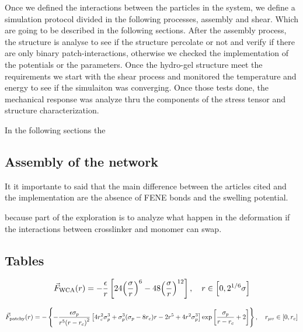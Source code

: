 \documentclass[../main.tex]{subfiles}
\begin{document}
Once we defined the interactions between the particles in the system, we define a simulation protocol divided in the following processes, assembly and shear.
Which are going to be described in the following sections.
After the assembly process, the structure is analyse to see if the structure percolate or not and verify if there are only binary patch-interactions, otherwise we checked the implementation of the potentials or the parameters.
Once the hydro-gel structure meet the requirements we start with the shear process and monitored the temperature and energy to see if the simulaiton was converging.
Once those tests done, the mechanical response was analyze thru the components of the stress tensor and structure characterization.

In the following sections the 

\subsection{Assembly of the network}\label{sec:descriptionSimulation}

It it importante to said that the main difference between the articles cited and the implementation are the absence of FENE bonds and the swelling potential.

because part of the exploration is to analyze what happen in the deformation if the interactions between crosslinker and monomer can swap.

\subsection{Tables}



\begin{gather}
\vec{F}_{\mathrm{WCA}}(r) = -\frac{\epsilon}{r}\left[24\qty(\frac{\sigma}{r})^6-48\qty(\frac{\sigma}{r})^{12}\right],\quad r\in\qty[0,2^{1/6}\sigma] 
\end{gather}


\begin{gather}
    \vec{F}_{\mathrm{patchy}}(r) =-\left\{ -\frac{\epsilon\sigma_p}{r^5\qty(r-r_c)^2} \left[ 4r_c^2\sigma^3_p + \sigma^3_p\qty(\sigma_p-8r_c) r -2r^5 + 4r^2 \sigma^3_p \right] \exp\left[\frac{\sigma_p}{r-r_c}+2\right]\right\},\quad r_{\mu\upsilon}\in\qty[0,r_c]
\end{gather}
\end{document}

